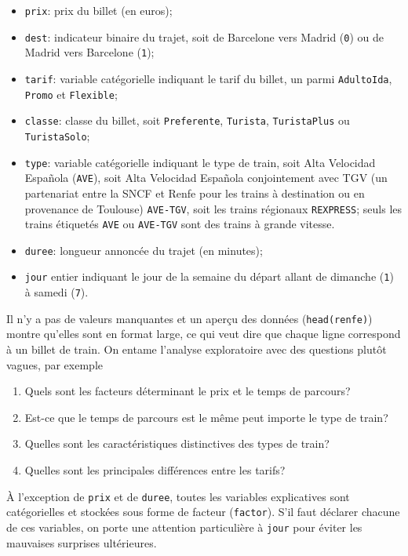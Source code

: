 \documentclass[
  11pt,
  letterpaper,
]{article}
\providecommand{\tightlist}{%
  \setlength{\itemsep}{0pt}\setlength{\parskip}{0pt}}
\theoremstyle{definition}
\theoremstyle{definition}
\theoremstyle{definition}
\theoremstyle{remark}
\begin{document}
\begin{itemize}
\tightlist
\item
  \texttt{prix}: prix du billet (en euros);
\item
  \texttt{dest}: indicateur binaire du trajet, soit de Barcelone vers Madrid (\texttt{0}) ou de Madrid vers Barcelone (\texttt{1});
\item
  \texttt{tarif}: variable catégorielle indiquant le tarif du billet, un parmi \texttt{AdultoIda}, \texttt{Promo} et \texttt{Flexible};
\item
  \texttt{classe}: classe du billet, soit \texttt{Preferente}, \texttt{Turista}, \texttt{TuristaPlus} ou \texttt{TuristaSolo};
\item
  \texttt{type}: variable catégorielle indiquant le type de train, soit Alta Velocidad Española (\texttt{AVE}), soit Alta Velocidad Española conjointement avec TGV (un partenariat entre la SNCF et Renfe pour les trains à destination ou en provenance de Toulouse) \texttt{AVE-TGV}, soit les trains régionaux \texttt{REXPRESS}; seuls les trains étiquetés \texttt{AVE} ou \texttt{AVE-TGV} sont des trains à grande vitesse.
\item
  \texttt{duree}: longueur annoncée du trajet (en minutes);
\item
  \texttt{jour} entier indiquant le jour de la semaine du départ allant de dimanche (\texttt{1}) à samedi (\texttt{7}).
\end{itemize}

Il n'y a pas de valeurs manquantes et un aperçu des données (\texttt{head(renfe)}) montre qu'elles sont en format large, ce qui veut dire que chaque ligne correspond à un billet de train. On entame l'analyse exploratoire avec des questions plutôt vagues, par exemple

\begin{enumerate}
\def\labelenumi{\arabic{enumi}.}
\tightlist
\item
  Quels sont les facteurs déterminant le prix et le temps de parcours?
\item
  Est-ce que le temps de parcours est le même peut importe le type de train?
\item
  Quelles sont les caractéristiques distinctives des types de train?
\item
  Quelles sont les principales différences entre les tarifs?
\end{enumerate}

À l'exception de \texttt{prix} et de \texttt{duree}, toutes les variables explicatives sont catégorielles et stockées sous forme de facteur (\texttt{factor}). S'il faut déclarer chacune de ces variables, on porte une attention particulière à \texttt{jour} pour éviter les mauvaises surprises ultérieures.
\end{document}
